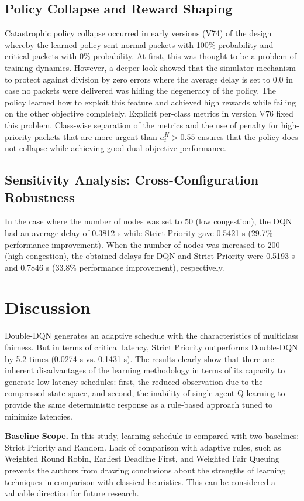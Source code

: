 \documentclass[runningheads]{llncs}
\begin{document}
\subsection{Policy Collapse and Reward Shaping}
Catastrophic policy collapse occurred in early versions (V74) of the design whereby the learned policy sent normal packets with 100\% probability and critical packets with 0\% probability. At first, this was thought to be a problem of training dynamics. However, a deeper look showed that the simulator mechanism to protect against division by zero errors where the average delay is set to 0.0 in case no packets were delivered was hiding the degeneracy of the policy. The policy learned how to exploit this feature and achieved high rewards while failing on the other objective completely. Explicit per-class metrics in version V76 fixed this problem. Class-wise separation of the metrics and the use of penalty for high-priority packets that are more urgent than $a_t^H>0.55$ ensures that the policy does not collapse while achieving good dual-objective performance.

\subsection{Sensitivity Analysis: Cross-Configuration Robustness}
In the case where the number of nodes was set to 50 (low congestion), the DQN had an average delay of 0.3812 s while Strict Priority gave 0.5421 s (29.7\% performance improvement). When the number of nodes was increased to 200 (high congestion), the obtained delays for DQN and Strict Priority were 0.5193 s and 0.7846 s (33.8\% performance improvement), respectively.

\section{Discussion}
Double-DQN generates an adaptive schedule with the characteristics of multiclass fairness. But in terms of critical latency, Strict Priority outperforms Double-DQN by 5.2 times (0.0274 s vs. 0.1431 s). The results clearly show that there are inherent disadvantages of the learning methodology in terms of its capacity to generate low-latency schedules: first, the reduced observation due to the compressed state space, and second, the inability of single-agent Q-learning to provide the same deterministic response as a rule-based approach tuned to minimize latencies.

\textbf{Baseline Scope.} In this study, learning schedule is compared with two baselines: Strict Priority and Random. Lack of comparison with adaptive rules, such as Weighted Round Robin, Earliest Deadline First, and Weighted Fair Queuing prevents the authors from drawing conclusions about the strengths of learning techniques in comparison with classical heuristics. This can be considered a valuable direction for future research.
\end{document}
